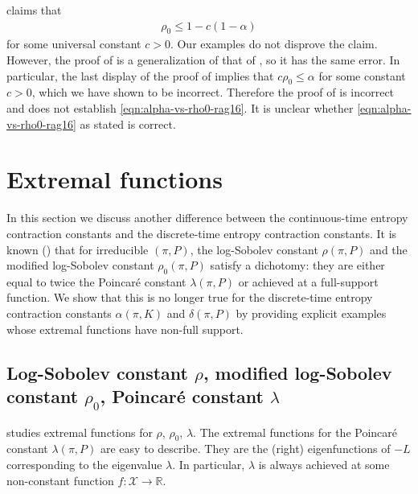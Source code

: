 \documentclass[11pt]{article}
\def\bR{\mathbb{R}}
\def\cX{\mathcal{X}}
\theoremstyle{definition}
\begin{document}
\cite[Prop.~4.3]{raginsky2016strong} claims that
\begin{align} \label{eqn:alpha-vs-rho0-rag16}
  \rho_0 \le 1-c(1-\alpha)
\end{align}
for some universal constant $c>0$. Our examples do not disprove the claim. However, the proof of \cite[Theorem 4.4]{raginsky2016strong} is a generalization of that of \cite[Prop.~5.1]{del2003contraction}, so it has the same error. In particular, the last display of the proof of \cite[Prop.~4.3]{raginsky2016strong} implies that $c \rho_0 \le \alpha$ for some constant $c>0$, which we have shown to be incorrect. Therefore the proof of \cite[Prop.~4.3]{raginsky2016strong} is incorrect and does not establish \cref{eqn:alpha-vs-rho0-rag16}. It is unclear whether \cref{eqn:alpha-vs-rho0-rag16} as stated is correct.


\section{Extremal functions} \label{sec:extremal}
In this section we discuss another difference between the continuous-time entropy contraction constants and the discrete-time entropy contraction constants.
It is known (\cite{bobkov2006modified}) that for irreducible $(\pi, P)$, the log-Sobolev constant $\rho(\pi, P)$ and the modified log-Sobolev constant $\rho_0(\pi, P)$ satisfy a dichotomy: they are either equal to twice the Poincar\'e constant $\lambda(\pi, P)$ or achieved at a full-support function.
We show that this is no longer true for the discrete-time entropy contraction constants $\alpha(\pi, K)$ and $\delta(\pi, P)$ by providing explicit examples whose extremal functions have non-full support.


\subsection{Log-Sobolev constant \texorpdfstring{$\rho$}{rho}, modified log-Sobolev constant \texorpdfstring{$\rho_0$}{rho0}, Poincar\'e constant \texorpdfstring{$\lambda$}{lambda}} \label{sec:extremal:rho-rho0-lambda}
\cite{bobkov2006modified} studies extremal functions for $\rho$, $\rho_0$, $\lambda$.
The extremal functions for the Poincar\'e constant $\lambda(\pi, P)$ are easy to describe.
They are the (right) eigenfunctions of $-L$ corresponding to the eigenvalue $\lambda$.
In particular, $\lambda$ is always achieved at some non-constant function $f: \cX \to \bR$.
\end{document}
